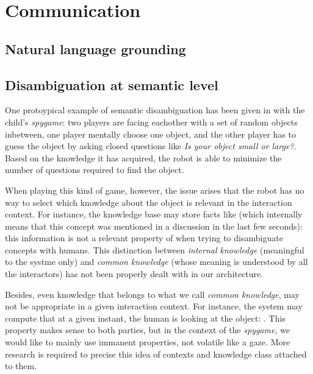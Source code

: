 \documentclass[letterpaper, 10 pt, conference]{ieeeconf}  %
\begin{document}
\section{Communication}
\label{sect|com}

\subsection{Natural language grounding}


\cite{Lemaignan2011a}

\subsection{Disambiguation at semantic level}

One protoypical example of semantic disambiguation has been given in
\cite{Ros2010b} with the child's \emph{spygame}: two players are facing
eachother with a set of random objects inbetween, one player mentally choose
one object, and the other player has to guess the object by asking closed
questions like \emph{Is your object small or large?}. Based on the knowledge it
has acquired, the robot is able to minimize the number of questions required to
find the object.

When playing this kind of game, however, the issue arises that the robot has no
way to select which knowledge about the object is relevant in the interaction
context. For instance, the knowledge base may store facts like  (which internally means that this concept was mentioned in a
discussion in the last few seconds): this information is not a relevant
property of  when trying to disambiguate concepts with humans.
This distinction between \emph{internal knowledge} (meaningful to
the systme only) and \emph{common knowledge} (whose meaning is understood by
all the interactors) has not been properly dealt with in our architecture.

Besides, even knowledge that belongs to what we call \emph{common knowledge},
may not be appropriate in a given interaction context. For instance, the system
may compute that at a given instant, the human is looking at the object:
. This property makes sense to both parties, but in
the context of the \emph{spygame}, we would like to mainly use immanent
properties, not volatile like a gaze. More research is required to precise this
idea of contexts and knowledge class attached to them.


\end{document}
